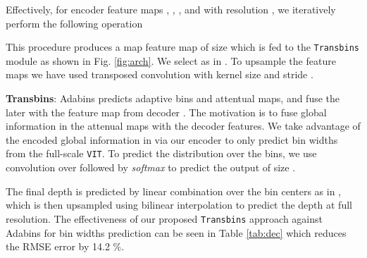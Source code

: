 \documentclass{article}
\newcommand{\myfirstpara}[1]{\noindent \textbf{#1}:}
\newcommand{\mypara}[1]{\vspace{0.5em} \myfirstpara{#1}}
\newcommand{\Transbins}{\texttt{Transbins}\xspace}
\newcommand{\ViT}{\texttt{VIT}\xspace}
\begin{document}
Effectively, for encoder feature maps , , , and  with resolution , we iteratively perform the following operation

This procedure produces a map feature map  of size  which is fed to the \Transbins module as shown in Fig. \ref{fig:arch}. We select  as in \cite{adabins}. To upsample the feature maps we have used transposed convolution with kernel size  and stride .

\mypara{Transbins}
Adabins \cite{adabins} predicts adaptive bins and attentual maps, and fuse the later with the feature map from decoder . The motivation is to fuse global information in the attenual maps with the decoder features. We take advantage of the encoded global information in  via our encoder to only predict bin widths from the full-scale \ViT. To predict the distribution over the bins, we use  convolution over  followed by \textit{softmax} to predict the output of size .


The final depth is predicted by linear combination over the bin centers as in \cite{adabins}, which is then upsampled using bilinear interpolation to predict the depth at full resolution. The effectiveness of our proposed \Transbins approach against Adabins for bin widths prediction can be seen in Table \ref{tab:dec} which reduces the RMSE error by 14.2 \%. 
\end{document}
